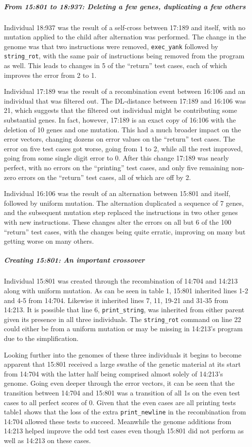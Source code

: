 \subparagraph{From 15:801 to 18:937: Deleting a few genes, duplicating a few others}

Individual 18:937 was the result of a self-cross between 17:189 and itself,
with no mutation applied to the child after alternation was performed. The
change in the genome was that two instructions were removed, 
\texttt{exec\_yank} followed by \texttt{string\_rot}, with the same pair of
instructions being removed from the program as well. This leads to changes
in 5 of the ``return'' test cases, each of which improves the error 
from 2 to 1.

Individual 17:189 was the result of a recombination event between 16:106
and an individual that was filtered out. The DL-distance between 17:189
and 16:106 was 21, which suggests that the filtered out individual might
be contributing some substantial genes. In fact, however, 17:189 is an
exact copy of 16:106 with the deletion of 10 genes and one mutation. This
had a much broader impact on the error vectors, changing dozens on error
values on the ``return'' test cases. The error on five test cases got worse,
going from 1 to 2, while all the rest improved, going from some single
digit error to 0. After this change 17:189 was nearly perfect, with no errors
on the ``printing'' test cases, and only five remaining non-zero errors on
the ``return'' test cases, all of which are off by 2.

Individual 16:106 was the result of an alternation between 15:801 and itself,
followed by uniform mutation. The alternation duplicated a sequence of 7 genes,
and the subsequent mutation step replaced the instructions in two other 
genes with new instructions. These changes alter the errors on all but 6 of
the 100 ``return'' test cases, with the changes being quite erratic, improving
on many but getting worse on many others.

\subparagraph{Creating 15:801: An important crossover}
\label{sec:15:801}
Individual 15:801 was created through the recombination of 14:704 and 14:213
along with uniform mutation. As can be seen in table 1, 15:801 inherited 
lines 1-2 and 4-5 from 14:704. Likewise it inherited lines 7, 11, 19-21 and 31-35
from 14:213. It is possible that line 6, \texttt{print\_string}, was inherited from either
parent given its presence in all three individuals. The \texttt{string\_rot} command on line
22 could either be from a uniform mutation or may be missing in 14:213's program due to the
simplification.

Looking further into the genomes of these three individuals it begins to become apparent that
15:801 received a large swathe of the genetic material at its start from 14:704 with the latter
half being comprised almost solely of 14:213's genome. Going even deeper through the error vectors,
it can be seen that the transition between 14:704 and 15:801 was a transition of all 1s on the even
test cases to all perfect scores of 0. Given that the even cases are all printing tests table1 shows
that the loss of the extra \texttt{print\_newline} in the recombination from 14:704 allowed these
tests to succeed. Meanwhile the genome additions from 14:213 helped improve the odd test cases even
though 15:801 did not perform as well as 14:213 on these cases.


